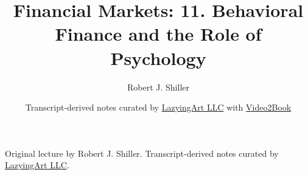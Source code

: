 \documentclass[11pt,oneside]{book}
\begin{document}
\frontmatter
\title{Financial Markets: 11. Behavioral Finance and the Role of Psychology}
\author{Robert J. Shiller}
\date{Transcript-derived notes curated by \href{https://lazying.art}{LazyingArt LLC} with \href{https://github.com/lachlanchen/Video2Book}{Video2Book}}
\maketitle
\begin{center}
\small Original lecture by Robert J. Shiller. Transcript-derived notes curated by \href{https://lazying.art}{LazyingArt LLC}.
\end{center}
\clearpage
\mainmatter

\end{document}
